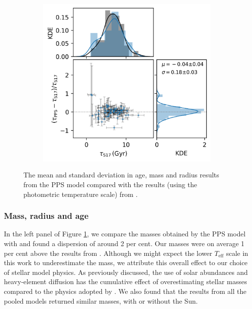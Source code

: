 \documentclass[a4paper,fleqn,usenatbib]{mnras}
\newcommand{\teff}{\ensuremath{T_\mathrm{eff}}}
\begin{document}
\begin{figure}
\begin{subfigure}[b]{.33\linewidth}
    \end{subfigure}%
    \begin{subfigure}[b]{.33\linewidth}
        \includegraphics[width=\linewidth]{figures/age_comp.png}
    \end{subfigure}%
    \caption{The mean and standard deviation in age, mass and radius results from the PPS model compared with the results (using the photometric temperature scale) from .}
    \label{fig:comp}
\end{figure}

\subsubsection{Mass, radius and age}

In the left panel of Figure \ref{fig:comp}, we compare the masses obtained by the PPS model with  and found a dispersion of around 2 per cent. Our masses were on average 1 per cent above the results from . Although we might expect the lower $\teff$ scale in this work to underestimate the mass, we attribute this overall effect to our choice of stellar model physics. As previously discussed, the use of \citet{Asplund.Grevesse.ea2009} solar abundances and heavy-element diffusion has the cumulative effect of overestimating stellar masses compared to the physics adopted by . We also found that the results from all the pooled models returned similar masses, with or without the Sun.
\end{document}
